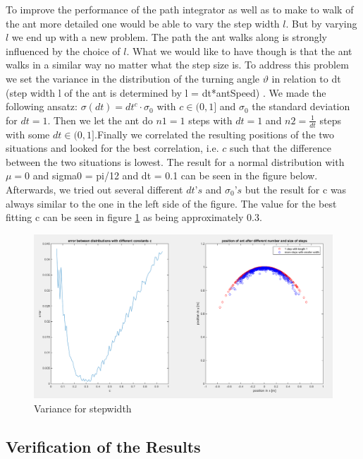 \documentclass[11pt]{article}
\begin{document}
To improve the performance of the path integrator as well as to make to walk of the ant more detailed one would be able to vary the step width $l$. 
But by varying $l$ we end up with a new problem. The path the ant walks along is strongly influenced by the choice of $l$. What we would like to have though is that the ant walks in a similar way no matter what the step size is. 
To address this problem we set the variance in the distribution of the turning angle $\vartheta$ in relation to dt (step width l of the ant is determined by l = dt*antSpeed) . 
We made the following ansatz: $\sigma(dt) = dt^{c} \cdot \sigma_{0}$ with $c \in (0,1]$ and $\sigma_{0}$ the standard deviation for $dt = 1$.
Then we let the ant do $n1=1$ steps with $dt=1$ and $n2=\frac{1}{dt}$ steps with some $dt \in (0,1]$.Finally we correlated the resulting positions of the two situations and looked for the best correlation, i.e. $c$ such that the difference between the two situations is lowest. 
The result for a normal distribution with $\mu = 0$ and sigma0 = pi/12 and dt = 0.1 can be seen in the figure below.
Afterwards, we tried out several different $dt’s$ and $\sigma_{0}’s$ but the result for c was always similar to the one in the left side of the figure. The value for the best fitting c can be seen in figure \ref{fig:Variance} as being approximately 0.3.  

\begin{figure}[H]
\centering
\includegraphics[scale=0.32]{./Pics/VarianceForStepWidth_plot.png} 
\caption{Variance for stepwidth \label{fig:Variance} }
\end{figure} 


\subsection{Verification of the Results}
\end{document}
